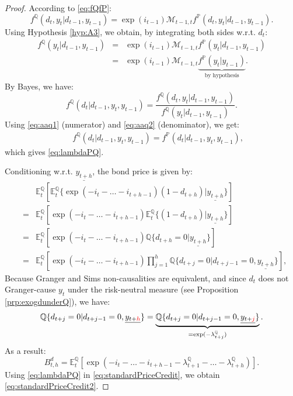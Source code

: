 \documentclass[
  12pt,
]{book}
\theoremstyle{definition}
\theoremstyle{definition}
\theoremstyle{definition}
\theoremstyle{definition}
\theoremstyle{remark}
\begin{document}
\begin{proof}
According to \eqref{eq:fQfP}:
\begin{equation}
f^{\mathbb{Q}}(d_t,y_t|d_{t-1},y_{t-1}) = \exp(i_{t-1})\mathcal{M}_{t-1,t} f^{\mathbb{P}}(d_t,y_t|d_{t-1},y_{t-1}).\label{eq:aaq1}
\end{equation}
Using Hypothesis \ref{hyp:A3}, we obtain, by integrating both sides w.r.t. \(d_t\):
\begin{eqnarray}
f^{\mathbb{Q}}(y_t|d_{t-1},y_{t-1}) &=& \exp(i_{t-1})\mathcal{M}_{t-1,t} f^{\mathbb{P}}(y_t|d_{t-1},y_{t-1})\nonumber\\
&=& \exp(i_{t-1})\mathcal{M}_{t-1,t} \underbrace{f^{\mathbb{P}}(y_t|y_{t-1})}_{\mbox{by hypothesis}}. \label{eq:aaq2}
\end{eqnarray}
By Bayes, we have:
\[
f^{\mathbb{Q}}(d_t|d_{t-1},y_t,y_{t-1}) = \frac{f^{\mathbb{Q}}(d_t,y_t|d_{t-1},y_{t-1})}{f^{\mathbb{Q}}(y_t|d_{t-1},y_{t-1})}.
\]
Using \eqref{eq:aaq1} (numerator) and \eqref{eq:aaq2} (denominator), we get:
\begin{eqnarray*}
&& f^{\mathbb{Q}}(d_t|d_{t-1},y_t,y_{t-1}) = f^{\mathbb{P}}(d_t|d_{t-1},y_t,y_{t-1}),
\end{eqnarray*}
which gives \eqref{eq:lambdaPQ}.

Conditioning w.r.t. \(\underline{y_{t+h}}\), the bond price is given by:
\begin{eqnarray*}
&& \mathbb{E}_t^{\mathbb{Q}}[\mathbb{E}_t^{\mathbb{Q}}\{\exp(-i_t-\dots-i_{t+h-1})(1-d_{t+h})|\underline{y_{t+h}}\}]\\
&=& \mathbb{E}_t^{\mathbb{Q}}[\exp(-i_t-\dots-i_{t+h-1})\mathbb{E}_t^{\mathbb{Q}}\{(1-d_{t+h})|\underline{y_{t+h}}\}]\\
&=& \mathbb{E}_t^{\mathbb{Q}}[\exp(-i_t-\dots-i_{t+h-1})\mathbb{Q}\{d_{t+h}=0|\underline{y_{t+h}}\}]\\
&=& \mathbb{E}_t^{\mathbb{Q}}\left[\exp(-i_t-\dots-i_{t+h-1})\prod_{j=1}^h\mathbb{Q}\{d_{t+j}=0|d_{t+j-1}=0,\underline{y_{t+h}}\}\right],
\end{eqnarray*}
Because Granger and Sims non-causalities are equivalent, and since \(d_t\) does not Granger-cause \(y_t\) under the risk-neutral measure (see Proposition \ref{prp:exogdunderQ}), we have:
\[
\mathbb{Q}\{d_{t+j}=0|d_{t+j-1}=0,\underline{y_{t+{\color{red}h}}}\} = \underbrace{\mathbb{Q}\{d_{t+j}=0|d_{t+j-1}=0,\underline{y_{t+{\color{red}j}}}\}}_{=\exp(-\lambda_{t+j}^{\mathbb{Q}})}.
\]
As a result:
\begin{equation}
B_{t,h}^d = \mathbb{E}_t^{\mathbb{Q}}\left[\exp\left(-i_t-\dots-i_{t+h-1}- \lambda_{t+1}^{\mathbb{Q}} - \dots - \lambda_{t+h}^{\mathbb{Q}}\right)\right].\label{eq:standardPriceCredit}
\end{equation}
Using \eqref{eq:lambdaPQ} in \eqref{eq:standardPriceCredit}, we obtain \eqref{eq:standardPriceCredit2}.
\end{proof}
\end{document}
